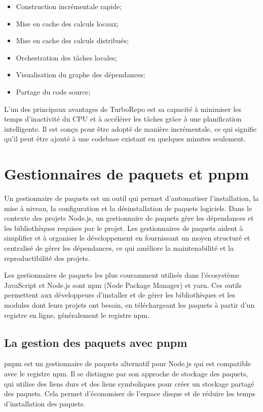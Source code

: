 \begin{itemize}
    \item Construction incrémentale rapide;
    \item Mise en cache des calculs locaux;
    \item Mise en cache des calculs distribués;
    \item Orchestration des tâches locales;
    \item Visualisation du graphe des dépendances;
    \item Partage du code source;
\end{itemize}

L'un des principaux avantages de TurboRepo est sa capacité à minimiser les temps d'inactivité du CPU et à accélérer les tâches grâce à une planification intelligente. Il est conçu pour être adopté de manière incrémentale, ce qui signifie qu'il peut être ajouté à une codebase existant en quelques minutes seulement.

\section{Gestionnaires de paquets et pnpm}

Un gestionnaire de paquets est un outil qui permet d'automatiser l'installation, la mise à niveau, la configuration et la désinstallation de paquets logiciels. Dans le contexte des projets Node.js, un gestionnaire de paquets gère les dépendances et les bibliothèques requises par le projet. Les gestionnaires de paquets aident à simplifier et à organiser le développement en fournissant un moyen structuré et centralisé de gérer les dépendances, ce qui améliore la maintenabilité et la reproductibilité des projets.

Les gestionnaires de paquets les plus couramment utilisés dans l'écosystème JavaScript et Node.js sont npm (Node Package Manager) et yarn. Ces outils permettent aux développeurs d'installer et de gérer les bibliothèques et les modules dont leurs projets ont besoin, en téléchargeant les paquets à partir d'un registre en ligne, généralement le registre npm\cite{Npm}.

\subsection{La gestion des paquets avec pnpm}

pnpm\cite{MotivationPnpm} est un gestionnaire de paquets alternatif pour Node.js qui est compatible avec le registre npm. Il se distingue par son approche de stockage des paquets, qui utilise des liens durs et des liens symboliques pour créer un stockage partagé des paquets. Cela permet d'économiser de l'espace disque et de réduire les temps d'installation des paquets.

